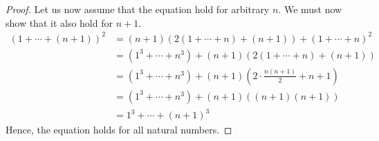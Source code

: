 \begin{exercise}[\textbf{1}]
\begin{enumerate}
\begin{proof}
              Let us now assume that the equation hold for
              arbitrary $n$. We must now show that it also hold for $n+1$.
              \begin{align*}
                  (1+\dotsb +(n+1))^2 &= (n+1)(2(1+\dotsb +n)+(n+1)) + (1+\dotsb +n)^2 \\
                  &= (1^3+\dotsb +n^3)+(n+1)(2(1+\dotsb +n)+(n+1)) \\
                  &= (1^3+\dotsb +n^3) + (n+1)(2\cdot \frac{n(n+1)}{2}+n+1) \\
                  &= (1^3+\dotsb +n^3) + (n+1)((n+1)(n+1)) \\
                  &= 1^3+\dotsb +(n+1)^3
              \end{align*}
              Hence, the equation holds for all natural numbers.
         \end{proof}
     \end{enumerate}
\end{exercise}